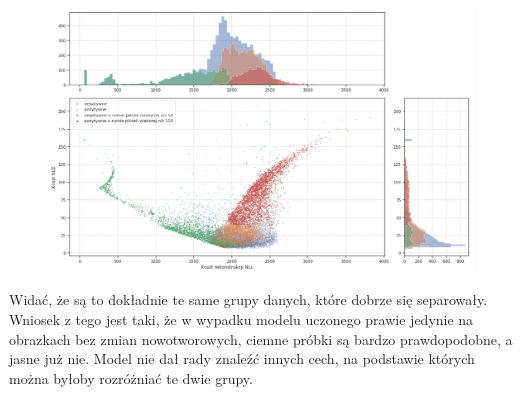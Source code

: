\begin{figure}[h!]
    \centering
    \includegraphics[width=1.0\textwidth]{images/soft_vae_th_v2}
    \caption{}
    \label{fig:soft_vae_th}
\end{figure}

Widać, że są to dokładnie te same grupy danych, które dobrze się separowały. Wniosek z tego jest taki, że w wypadku modelu uczonego prawie jedynie na obrazkach bez zmian nowotworowych, ciemne próbki są bardzo prawdopodobne, a jasne już nie. Model nie dał rady znaleźć innych cech, na podstawie których można byłoby rozróżniać te dwie grupy.





